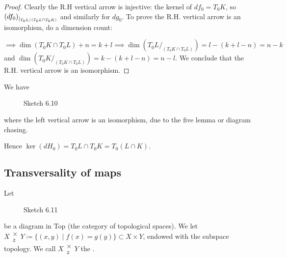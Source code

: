 \begin{proof}
    Clearly the R.H vertical arrow is injective: the kernel of \(df_0=T_0K\), so \((df_0)_{|_{T_0L/(T_0L\cap T_0K)}}\) and similarly for \(dg_0\).
    To prove the R.H. vertical arrow is an isomorphism, do a dimension count: 
    \begin{center}
    \end{center}
    \(\implies \dim(T_0K\cap T_0L)+n=k+l\implies \dim(T_0L/_{(T_0K\cap T_0L)})=l-(k+l-n)=n-k\) and \(\dim(T_0K/_{(T_0K\cap T_0L)})=k-(k+l-n)=n-l\).
    We conclude that the R.H. vertical arrow is an isomorphism. 
\end{proof}

\begin{remark}
    We have 
    \begin{figure}[H]\label{fig:6.10}
        \centering
        \caption{Sketch 6.10}
    \end{figure}
    where the left vertical arrow is an isomorphism, due to the five lemma or diagram chasing.

    Hence \(\ker (dH_0)=T_0L\cap T_0K=T_0(L\cap K)\).
\end{remark}

\subsection{Transversality of maps}

\begin{definition*} %
    Let \begin{figure}[H]\label{fig:6.11}
        \centering
        \caption{Sketch 6.11}
    \end{figure}
    be a diagram in Top (the category of topological spaces). We let \(X\substack{\times\\z} Y \coloneqq \{(x,y)\mid f(x)=g(y)\}\subset X\times Y\),
    endowed with the subspace topology. We call \(X\substack{\times\\z} Y\) the .
\end{definition*}

